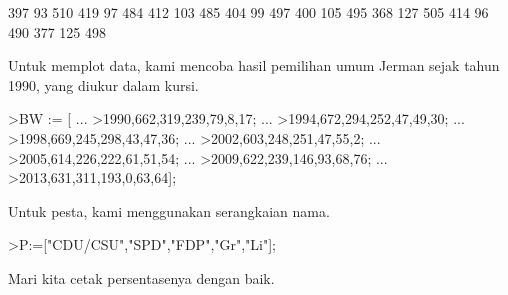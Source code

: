 \documentclass[a4paper,10pt]{article}
\begin{document}
\begin{eulernotebook}
\begin{eulercomment}
\begin{eulercomment}
\begin{eulercomment}
\begin{eulercomment}
\begin{eulercomment}
\begin{eulercomment}
\begin{eulercomment}
\begin{eulercomment}
\begin{eulercomment}
\begin{eulercomment}
\begin{eulercomment}
\begin{eulercomment}
\begin{eulercomment}
\begin{eulercomment}
\begin{eulercomment}
\begin{eulercomment}
\begin{eulercomment}
\begin{eulercomment}
\begin{euleroutput}
            397            93           510 
            419            97           484 
            412           103           485 
            404            99           497 
            400           105           495 
            368           127           505 
            414            96           490 
            377           125           498 
\end{euleroutput}
\begin{eulercomment}
Untuk memplot data, kami mencoba hasil pemilihan umum Jerman sejak
tahun 1990, yang diukur dalam kursi.
\end{eulercomment}
\begin{eulerprompt}
>BW := [ ...
>1990,662,319,239,79,8,17; ...
>1994,672,294,252,47,49,30; ...
>1998,669,245,298,43,47,36; ...
>2002,603,248,251,47,55,2; ...
>2005,614,226,222,61,51,54; ...
>2009,622,239,146,93,68,76; ...
>2013,631,311,193,0,63,64];
\end{eulerprompt}
\begin{eulercomment}
Untuk pesta, kami menggunakan serangkaian nama.
\end{eulercomment}
\begin{eulerprompt}
>P:=["CDU/CSU","SPD","FDP","Gr","Li"];
\end{eulerprompt}
\begin{eulercomment}
Mari kita cetak persentasenya dengan baik.


\end{eulercomment}
\end{eulercomment}
\end{eulercomment}
\end{eulercomment}
\end{eulercomment}
\end{eulercomment}
\end{eulercomment}
\end{eulercomment}
\end{eulercomment}
\end{eulercomment}
\end{eulercomment}
\end{eulercomment}
\end{eulercomment}
\end{eulercomment}
\end{eulercomment}
\end{eulercomment}
\end{eulercomment}
\end{eulercomment}
\end{eulercomment}
\end{eulernotebook}
\end{document}
